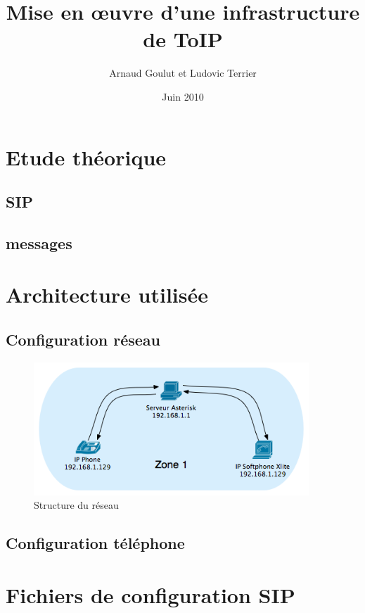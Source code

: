 \documentclass[12pt,a4paper,notitlepage]{article}
\begin{document}
\title{Mise en \oe uvre d'une infrastructure de ToIP}
\author{Arnaud Goulut et Ludovic Terrier}
\date{Juin 2010}
\maketitle



\thispagestyle{empty}


 
\section{Etude théorique}
\subsection{SIP}
\subsection{messages}

\section{Architecture utilisée}
\subsection{Configuration réseau}
\begin{figure}[!h]
\begin{center}
\includegraphics[height=5cm]{structure_reseau}
\caption{Structure du réseau}
\label{fig:da}
\end{center}
\end{figure}

\subsection{Configuration téléphone}
\clearpage
\section{Fichiers de configuration SIP}
\end{document}
